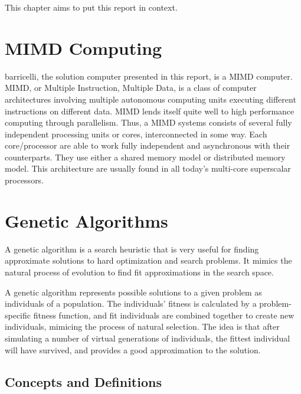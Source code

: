 This chapter aims to put this report in context.

\section{MIMD Computing}

\Gls{barricelli}, the solution computer presented in this report, is a \Gls{MIMD} computer. \Gls{MIMD}, or Multiple Instruction, Multiple Data, is a class of computer architectures involving multiple autonomous computing units executing different instructions on different data.
MIMD lends itself quite well to high performance computing through parallelism. Thus, a MIMD systems consists of several fully independent processing units or cores, interconnected in some way. Each core/processor are able to work fully independent and asynchronous with their counterparts. They use either a shared memory model or distributed memory model. This architecture are usually found in all today’s multi-core superscalar processors. 







\section{Genetic Algorithms}

A genetic algorithm is a search heuristic that is very useful for finding approximate solutions to hard optimization and search problems.
It mimics the natural process of evolution to find fit approximations in the search space.

A genetic algorithm represents possible solutions to a given problem as individuals of a population.
The individuals' fitness is calculated by a problem-specific fitness function, and fit individuals are combined together to create new individuals, mimicing the process of natural selection.
The idea is that after simulating a number of virtual generations of individuals, the fittest individual will have survived, and provides a good approximation to the solution.

\subsection{Concepts and Definitions}

